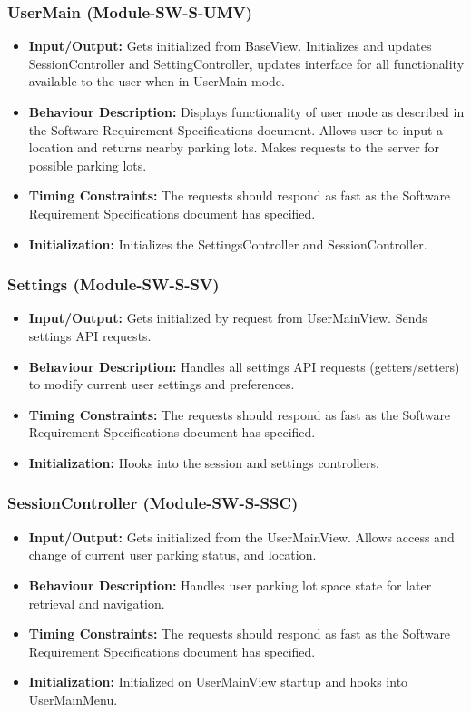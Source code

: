 \documentclass[]{article}
\begin{document}
	\subsubsection{UserMain (Module-SW-S-UMV)}
	\begin{itemize}
		\item \textbf{Input/Output:} Gets initialized from BaseView. Initializes and updates SessionController and SettingController, updates interface for all functionality available to the user when in UserMain mode.
		\item \textbf{Behaviour Description:} Displays functionality of user mode as described in the Software Requirement Specifications document. Allows user to input a location and returns nearby parking lots. Makes requests to the server for possible parking lots.
		\item \textbf{Timing Constraints:} The requests should respond as fast as the Software Requirement Specifications document has specified.
		\item \textbf{Initialization:} Initializes the SettingsController and SessionController.
	\end{itemize}
	
	\subsubsection{Settings (Module-SW-S-SV)}
	\begin{itemize}
		\item \textbf{Input/Output:} Gets initialized by request from UserMainView. Sends settings API requests.
		\item \textbf{Behaviour Description:} Handles all settings API requests (getters/setters) to modify current user settings and preferences.
		\item \textbf{Timing Constraints:} The requests should respond as fast as the Software Requirement Specifications document has specified.
		\item \textbf{Initialization:} Hooks into the session and settings controllers.
	\end{itemize}
	
	\subsubsection{SessionController (Module-SW-S-SSC)}
	\begin{itemize}
		\item \textbf{Input/Output:} Gets initialized from the UserMainView. Allows access and change of current user parking status, and location.
		\item \textbf{Behaviour Description:} Handles user parking lot space state for later retrieval and navigation.
		\item \textbf{Timing Constraints:} The requests should respond as fast as the Software Requirement Specifications document has specified.
		\item \textbf{Initialization:} Initialized on UserMainView startup and hooks into UserMainMenu.
	\end{itemize}
	
\end{document}
